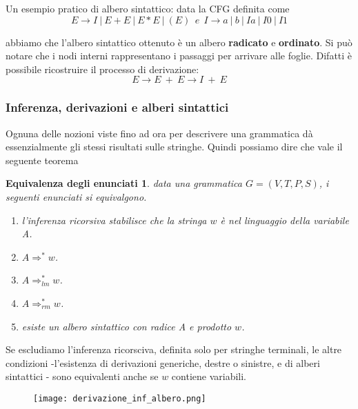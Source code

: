 \documentclass[11pt]{article}
\newtheorem{eqEnunciati}{Equivalenza degli enunciati}
\begin{document}
Un esempio pratico di albero sintattico: data la CFG definita come
\begin{equation}
E \rightarrow I\medspace |\medspace E+ E\medspace |\medspace E*E\medspace |\medspace (E)\medspace \medspace e \medspace \medspace I \rightarrow a\medspace |\medspace b \medspace |\medspace Ia\medspace |\medspace I0\medspace |\medspace I1
\end{equation}


\begin{center}
\end{center}
abbiamo che l'albero sintattico ottenuto è un albero \textbf{radicato} e \textbf{ordinato}. Si può notare che i \color{blue}nodi interni \color{black} rappresentano i passaggi per arrivare alle \color{red}foglie\color{black}. Difatti è possibile ricostruire il processo di derivazione: $$E \rightarrow E \medspace + \medspace E \rightarrow I \medspace + \medspace E$$

\subsubsection{Inferenza, derivazioni e alberi sintattici}
Ognuna delle nozioni viste fino ad ora  per descrivere una grammatica dà essenzialmente gli stessi risultati sulle stringhe. Quindi possiamo dire che vale il seguente teorema
\begin{eqEnunciati}
data una grammatica $G=(V,T,P,S)$, i seguenti enunciati si equivalgono.
\begin{enumerate}
	\item l'inferenza ricorsiva stabilisce che la stringa $w$ è nel linguaggio della variabile A.
	\item $A\Rightarrow^{*} w$.
	\item $A\Rightarrow^{*}_{lm} w$.
	\item $A\Rightarrow^{*}_{rm} w$.
	\item esiste un albero sintattico con radice A e prodotto $w$.
\end{enumerate}
\end{eqEnunciati}
Se escludiamo l'inferenza ricorsciva, definita solo per stringhe terminali, le altre condizioni -l'esistenza di derivazioni generiche, destre o sinistre, e di alberi sintattici - sono equivalenti anche se $w$ contiene variabili.
\begin{figure}[H]
\texttt{[image: derivazione\_inf\_albero.png]}
\centering
\end{figure}
\end{document}
